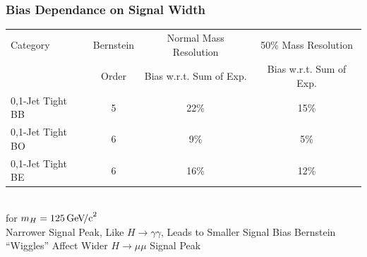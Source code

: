 \documentclass{beamer}
\newcommand{\GeVcc}{\ensuremath{\,\mathrm{Ge\kern -0.1em V\!/c}^2}}
\begin{document}
\begin{frame}
\frametitle{Bias Dependance on Signal Width}
  \begin{center}
    \scriptsize
    \begin{tabular}{|l|c|c|c|} \hline
Category & Bernstein & Normal Mass Resolution & 50\% Mass Resolution \\
         & Order     & Bias w.r.t. Sum of Exp. &  Bias w.r.t. Sum of Exp. \\ \hline \hline
0,1-Jet Tight BB & 5 & 22\% & 15\% \\ \hline
0,1-Jet Tight BO & 6 & 9\%  &  5\% \\ \hline
0,1-Jet Tight BE & 6 & 16\% & 12\% \\ \hline
    \end{tabular}
    \\ for $m_H=125\GeVcc{}$
  \small
  \\ \vspace{1em}
  Narrower Signal Peak, Like $H\rightarrow\gamma\gamma$,
   Leads to Smaller Signal Bias
  Bernstein ``Wiggles'' Affect Wider $H\rightarrow\mu\mu$ Signal Peak
  \end{center}
\end{frame}
\end{document}
